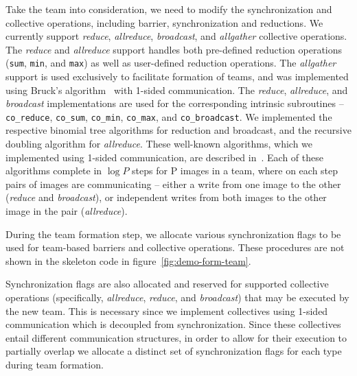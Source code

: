 Take the team into consideration, we need to modify the synchronization and collective operations, including barrier, synchronization and reductions. We currently support \textit{reduce}, \textit{allreduce}, \textit{broadcast},
and \textit{allgather} collective operations. The \textit{reduce} and
\textit{allreduce} support handles both pre-defined reduction operations
(\texttt{sum}, \texttt{min}, and \texttt{max}) as well as user-defined
reduction operations. The \textit{allgather} support is used
exclusively to facilitate formation of teams, and was implemented using
Bruck's algorithm~\cite{bruck1997efficient} with 1-sided communication. The \textit{reduce},
\textit{allreduce}, and \textit{broadcast} implementations are used for the
corresponding intrinsic subroutines -- \texttt{co\_reduce}, \texttt{co\_sum},
\texttt{co\_min}, \texttt{co\_max}, and \texttt{co\_broadcast}. We implemented
the respective binomial tree algorithms for reduction and broadcast, and the
recursive doubling algorithm for \textit{allreduce}. These well-known
algorithms, which we implemented using 1-sided communication, are described in~\cite{thakur2005optimization}. Each of these algorithms complete in $\log P$
steps for P images in a team, where on each step pairs of images are
communicating -- either a write from one image to the other (\textit{reduce}
and \textit{broadcast}), or independent writes from both images to the other
image in the pair (\textit{allreduce}).

During the team formation step, we allocate various synchronization flags
to be used for team-based barriers and collective operations. These procedures are not shown in the skeleton code in figure~\ref{fig:demo-form-team}.

Synchronization flags are also allocated and reserved for supported collective
operations (specifically, \textit{allreduce}, \textit{reduce}, and
\textit{broadcast}) that may be executed by the new team. This is necessary since we implement
collectives using 1-sided communication which is decoupled from
synchronization. Since these collectives entail different communication
structures, in order to allow for their execution to partially overlap we
allocate a distinct set of synchronization flags for each type during team
formation. 


